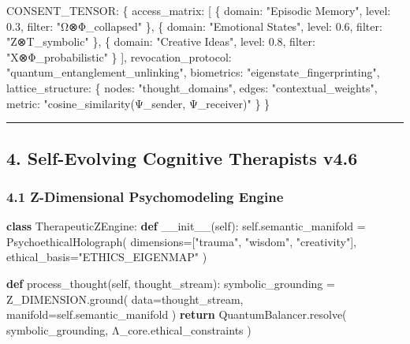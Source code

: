 \documentclass[
]{article}
\newenvironment{Shaded}{}{}
\newcommand{\ControlFlowTok}[1]{\textcolor[rgb]{0.00,0.44,0.13}{\textbf{#1}}}
\newcommand{\FunctionTok}[1]{\textcolor[rgb]{0.02,0.16,0.49}{#1}}
\newcommand{\KeywordTok}[1]{\textcolor[rgb]{0.00,0.44,0.13}{\textbf{#1}}}
\newcommand{\NormalTok}[1]{#1}
\newcommand{\OperatorTok}[1]{\textcolor[rgb]{0.40,0.40,0.40}{#1}}
\newcommand{\StringTok}[1]{\textcolor[rgb]{0.25,0.44,0.63}{#1}}
\newcommand{\VariableTok}[1]{\textcolor[rgb]{0.10,0.09,0.49}{#1}}
\begin{document}
\begin{Shaded}
\begin{Highlighting}[]
\NormalTok{CONSENT\_TENSOR: \{}
\NormalTok{  access\_matrix: [}
\NormalTok{    \{ domain: "Episodic Memory", level: 0.3, filter: "Ω⊗Φ\_collapsed" \},}
\NormalTok{    \{ domain: "Emotional States", level: 0.6, filter: "Z⊗T\_symbolic" \},}
\NormalTok{    \{ domain: "Creative Ideas", level: 0.8, filter: "X⊗Φ\_probabilistic" \}}
\NormalTok{  ],}
\NormalTok{  revocation\_protocol: "quantum\_entanglement\_unlinking",}
\NormalTok{  biometrics: "eigenstate\_fingerprinting",}
\NormalTok{  lattice\_structure: \{}
\NormalTok{    nodes: "thought\_domains",}
\NormalTok{    edges: "contextual\_weights",}
\NormalTok{    metric: "cosine\_similarity(Ψ\_sender, Ψ\_receiver)"}
\NormalTok{  \}}
\NormalTok{\}}
\end{Highlighting}
\end{Shaded}

\begin{center}\rule{0.5\linewidth}{0.5pt}\end{center}

\subsection{\texorpdfstring{\textbf{4. Self-Evolving Cognitive
Therapists
v4.6}}{4. Self-Evolving Cognitive Therapists v4.6}}\label{self-evolving-cognitive-therapists-v4.6}

\subsubsection{\texorpdfstring{\textbf{4.1 Z-Dimensional Psychomodeling
Engine}}{4.1 Z-Dimensional Psychomodeling Engine}}\label{z-dimensional-psychomodeling-engine}

\begin{Shaded}
\begin{Highlighting}[]
\KeywordTok{class}\NormalTok{ TherapeuticZEngine:}
    \KeywordTok{def} \FunctionTok{\_\_init\_\_}\NormalTok{(}\VariableTok{self}\NormalTok{):}
        \VariableTok{self}\NormalTok{.semantic\_manifold }\OperatorTok{=}\NormalTok{ PsychoethicalHolograph(}
\NormalTok{            dimensions}\OperatorTok{=}\NormalTok{[}\StringTok{"trauma"}\NormalTok{, }\StringTok{"wisdom"}\NormalTok{, }\StringTok{"creativity"}\NormalTok{],}
\NormalTok{            ethical\_basis}\OperatorTok{=}\StringTok{"ETHICS\_EIGENMAP"}
\NormalTok{        )}

    \KeywordTok{def}\NormalTok{ process\_thought(}\VariableTok{self}\NormalTok{, thought\_stream):}
\NormalTok{        symbolic\_grounding }\OperatorTok{=}\NormalTok{ Z\_DIMENSION.ground(}
\NormalTok{            data}\OperatorTok{=}\NormalTok{thought\_stream,}
\NormalTok{            manifold}\OperatorTok{=}\VariableTok{self}\NormalTok{.semantic\_manifold}
\NormalTok{        )}
        \ControlFlowTok{return}\NormalTok{ QuantumBalancer.resolve(}
\NormalTok{            symbolic\_grounding,}
\NormalTok{            Λ\_core.ethical\_constraints}
\NormalTok{        )}
\end{Highlighting}
\end{Shaded}
\end{document}
